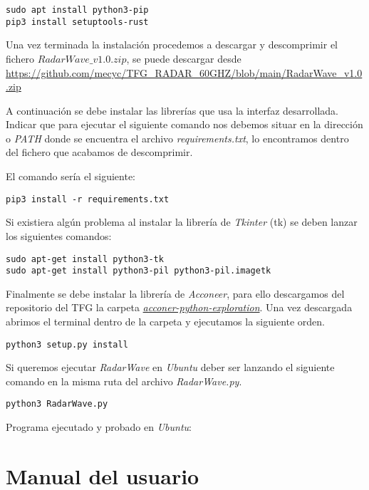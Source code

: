 \begin{verbatim}
sudo apt install python3-pip
pip3 install setuptools-rust
\end{verbatim}

Una vez terminada la instalación procedemos a descargar y descomprimir el fichero \textit{$RadarWave\_v1.0.zip$}, se puede descargar desde \url{https://github.com/mecyc/TFG_RADAR_60GHZ/blob/main/RadarWave_v1.0.zip}

A continuación se debe instalar las librerías que usa la interfaz desarrollada. Indicar que para ejecutar el siguiente comando nos debemos situar en la dirección o \textit{PATH} donde se encuentra el archivo \textit{requirements.txt}, lo encontramos dentro del fichero que acabamos de descomprimir.

El comando sería el siguiente:
\begin{verbatim}
pip3 install -r requirements.txt
\end{verbatim}

Si existiera algún problema al instalar la librería de \textit{Tkinter} (tk) se deben lanzar los siguientes comandos:
\begin{verbatim}
sudo apt-get install python3-tk
sudo apt-get install python3-pil python3-pil.imagetk
\end{verbatim}

Finalmente se debe instalar la librería de \textit{Acconeer}, para ello descargamos del repositorio del TFG la carpeta \href{https://github.com/mecyc/TFG_RADAR_60GHZ/tree/main/acconeer-python-exploration}{\textit{acconer-python-exploration}}. Una vez descargada abrimos el terminal dentro de la carpeta y ejecutamos la siguiente orden.

\begin{verbatim}
python3 setup.py install
\end{verbatim}

Si queremos ejecutar \textit{RadarWave} en \textit{Ubuntu} deber ser lanzando el siguiente comando en la misma ruta del archivo \textit{RadarWave.py}.

\begin{verbatim}
python3 RadarWave.py
\end{verbatim}


Programa ejecutado y probado en \textit{Ubuntu}:


\section{Manual del usuario}

